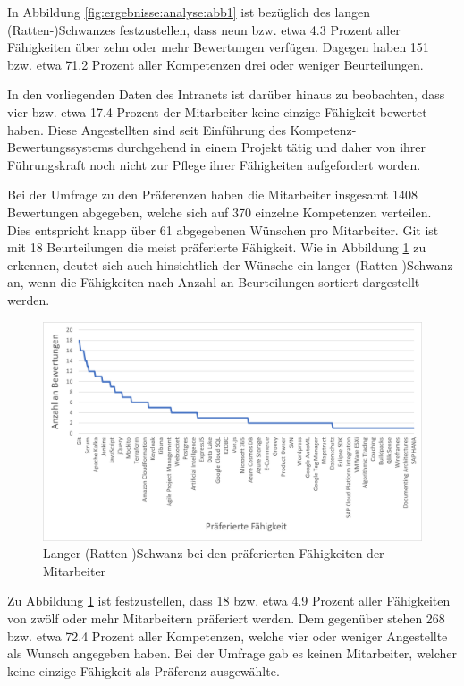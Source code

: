 In Abbildung \ref{fig:ergebnisse:analyse:abb1} ist bezüglich des langen (Ratten-)Schwanzes festzustellen, dass neun bzw. etwa 4.3 Prozent aller Fähigkeiten über zehn oder mehr Bewertungen verfügen. Dagegen haben 151 bzw. etwa 71.2 Prozent aller Kompetenzen drei oder weniger Beurteilungen.

In den vorliegenden Daten des Intranets ist darüber hinaus zu beobachten, dass vier bzw. etwa 17.4 Prozent der Mitarbeiter keine einzige Fähigkeit bewertet haben. Diese Angestellten sind seit Einführung des Kompetenz-Bewertungssystems durchgehend in einem Projekt tätig und daher von ihrer Führungskraft noch nicht zur Pflege ihrer Fähigkeiten aufgefordert worden.

Bei der Umfrage zu den Präferenzen haben die Mitarbeiter insgesamt 1408 Bewertungen abgegeben, welche sich auf 370 einzelne Kompetenzen verteilen. Dies entspricht knapp über 61 abgegebenen Wünschen pro Mitarbeiter. Git ist mit 18 Beurteilungen die meist präferierte Fähigkeit. Wie in Abbildung \ref{fig:ergebnisse:analyse:abb2} zu erkennen, deutet sich auch hinsichtlich der Wünsche ein langer (Ratten-)Schwanz an, wenn die Fähigkeiten nach Anzahl an Beurteilungen sortiert dargestellt werden.
 
\begin{figure}[h]
	\centering
	\includegraphics[width=1\textwidth]{gfx/long-tail-praeferenzen.png}
	\caption{Langer (Ratten-)Schwanz bei den präferierten Fähigkeiten der Mitarbeiter}
	\label{fig:ergebnisse:analyse:abb2}
\end{figure}

Zu Abbildung \ref{fig:ergebnisse:analyse:abb2} ist festzustellen, dass 18 bzw. etwa 4.9 Prozent aller Fähigkeiten von zwölf oder mehr Mitarbeitern präferiert werden. Dem gegenüber stehen 268 bzw. etwa 72.4 Prozent aller Kompetenzen, welche vier oder weniger Angestellte als Wunsch angegeben haben. Bei der Umfrage gab es keinen Mitarbeiter, welcher keine einzige Fähigkeit als Präferenz ausgewählte.

